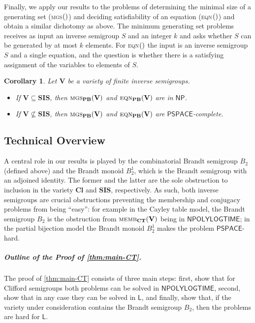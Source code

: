 \documentclass[anonymous,letter,UKenglish,cleveref,autoref,thm-restate]{lipics-v2021}
\newcommand{\sse}{\subseteq}
\newcommand{\NPOLYLOGTIME}{\ensuremath{\mathsf{NPOLYLOGTIME}}\xspace}
\newcommand{\LOGSPACE}{\ensuremath{\mathsf{L}}\xspace}
\newcommand{\NP}{\ensuremath{\mathsf{NP}}\xspace}
\newcommand{\PSPACE}{\ensuremath{\mathsf{PSPACE}}\xspace}
\newcommand{\vV}{\ensuremath{\mathbf{V}}}
\newcommand{\vCl}{\ensuremath{\mathbf{Cl}}}
\newcommand{\vSI}{\ensuremath{\mathbf{SIS}}}
\theoremstyle{plain}
\theoremstyle{plain}
\newtheorem{maincorollary}[maintheorem]{Corollary}
\newcommand{\dMemb}[2][]{\textup{\textsc{memb${}_{\mathbf{#1}}\expandafter\ifx\expandafter\relax\detokenize{#2}\relax\else(#2)\fi$}}}
\newcommand{\dMGS}[2][]{\textup{\textsc{mgs${}_{\mathbf{#1}}\expandafter\ifx\expandafter\relax\detokenize{#2}\relax\else(#2)\fi$}}}
\newcommand{\dEqn}[2][]{\textup{\textsc{eqn${}_{\mathbf{#1}}\expandafter\ifx\expandafter\relax\detokenize{#2}\relax\else(#2)\fi$}}}
\newcommand{\mysubparagraph}[1]{\vspace*{-2mm}\subparagraph*{#1}}
\begin{document}
Finally, we apply our results to the problems of determining the minimal size of a generating set (\dMGS{}) and deciding satisfiability of an equation (\dEqn{}) and obtain a similar dichotomy as above.
The minimum generating set problems receives as input an inverse semigroup $S$ and an integer $k$ and asks whether $S$ can be generated by at most $k$ elements.
For \dEqn{} the input is an inverse semigroup $S$ and a single equation, and the question is whether there is a satisfying assignment of the variables to elements of $S$.

\begin{maincorollary}\label{cor:main-mgs-equations}
	Let $\vV$ be a variety of finite inverse semigroups.
  \begin{itemize}
    \item If $\vV \sse \vSI$, then $\dMGS[PB]{\vV}$ and $\dEqn[PB]{\vV}$ are in \NP.
    \item If $\vV \not\sse \vSI$, then $\dMGS[PB]{\vV}$ and $\dEqn[PB]{\vV}$ are \PSPACE-complete.
  \end{itemize}
\end{maincorollary}

\subsection{Technical Overview}\label{sec:technical-overview}

A central role in our results is played by the combinatorial Brandt semigroup $B_2$ (defined above) and the Brandt monoid $B_2^1$, which is the Brandt semigroup with an adjoined identity.
The former and the latter are the sole obstruction to inclusion in the variety $\vCl$ and $\vSI$, respectively.
As such, both inverse semigroups are crucial obstructions preventing the membership and conjugacy problems from being ``easy'':
for example in the Cayley table model, the Brandt semigroup $B_2$ is the obstruction from $\dMemb[CT]{\vV}$ being in \NPOLYLOGTIME; in the partial bijection model the Brandt monoid $B_2^1$ makes the problem \PSPACE-hard.



\mysubparagraph{Outline of the Proof of \cref{thm:main-CT}.}
The proof of \cref{thm:main-CT} consists of three main steps: first, show that for Clifford semigroups both problems can be solved in \NPOLYLOGTIME, second, show that in any case they can be solved in \LOGSPACE, and finally, show that, if the variety under consideration contains the Brandt semigroup $B_2$, then the problems are hard for \LOGSPACE.
\end{document}
